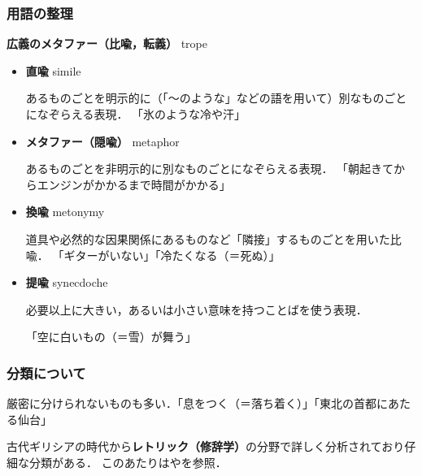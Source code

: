 \documentclass[11pt]{beamer}
\let\oldcite=\citet
\renewcommand\citet[1]{\hyperlink{#1}{\oldcite{#1}}}
\begin{document}
\begin{frame}
\frametitle{用語の整理}
\textbf{広義のメタファー（比喩，転義）} trope
\begin{itemize}
    \item \textbf{直喩} simile

        あるものごとを明示的に（「〜のような」などの語を用いて）別なものごとになぞらえる表現．
        「氷のような冷や汗」 %

    \item \textbf{メタファー（隠喩）} metaphor

        あるものごとを非明示的に別なものごとになぞらえる表現．
        「朝起きてからエンジンがかかるまで時間がかかる」

    \item \textbf{換喩} metonymy

        道具や必然的な因果関係にあるものなど「隣接」するものごとを用いた比喩．
        「ギターがいない」「冷たくなる（＝死ぬ）」

    \item \textbf{提喩} synecdoche

        必要以上に大きい，あるいは小さい意味を持つことばを使う表現．

        「空に白いもの（＝雪）が舞う」
\end{itemize}
\end{frame}

\begin{frame}
\frametitle{分類について}
厳密に分けられないものも多い．「息をつく（＝落ち着く）」「東北の首都にあたる仙台」

\bigskip

古代ギリシアの時代から\textbf{レトリック（修辞学）}の分野で詳しく分析されており仔細な分類がある．
このあたりは\citet{rhetorickankaku}や\citet{rhetoricjiten}を参照．

\end{frame}
\end{document}
